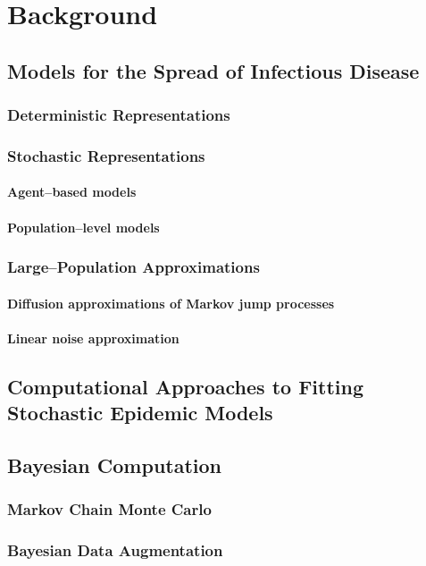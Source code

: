 \chapter{Background}
\label{chap:background}

\section{Models for the Spread of Infectious Disease}
\label{sec:outbreak_models}

\subsection{Deterministic Representations}
\label{subsec:deterministic_models}

\subsection{Stochastic Representations}
\label{subsec:stochastic_models}

\subsubsection{Agent--based models}
\label{subsubsec:agent_based_models}

\subsubsection{Population--level models}
\label{subsubsec:pop_level_models}

\subsection{Large--Population Approximations}
\label{subsec:large_pop_approx}

\subsubsection{Diffusion approximations of Markov jump processes}
\label{subsubsec:diff_approx}

\subsubsection{Linear noise approximation}
\label{subsubsec:lna_background}

\section{Computational Approaches to Fitting Stochastic Epidemic Models}
\label{sec:computational_background}

\section{Bayesian Computation}
\label{sec:bayesian_computation}

\subsection{Markov Chain Monte Carlo}
\label{subsec:mcmc}

\subsection{Bayesian Data Augmentation}
\label{subsec:data_augmentation}